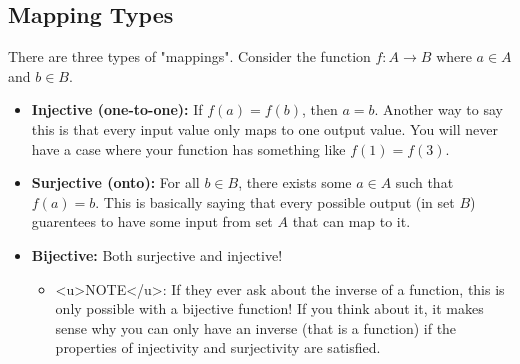 \subsection{Mapping Types}

There are three types of "mappings". Consider the function $f: A \to B$ where $a \in A$ and $b \in B$. 

\begin{itemize}
\item \textbf{Injective (one-to-one):} If $f(a) = f(b)$, then $a = b$. Another way to say this is that every input value only maps to one output value. You will never have a case where your function has something like $f(1) = f(3)$. 
\item \textbf{Surjective (onto):} For all $b \in B$, there exists some $a \in A$ such that $f(a) = b$. This is basically saying that every possible output (in set $B$) guarentees to have some input from set $A$ that can map to it. 
\item \textbf{Bijective:} Both surjective and injective! 
  \begin{itemize} 
    \item <u>NOTE</u>: If they ever ask about the inverse of a function, this is only possible with a bijective function! If you think about it, it makes sense why you can only have an inverse (that is a function) if the properties of injectivity and surjectivity are satisfied.
  \end{itemize}
\end{itemize}